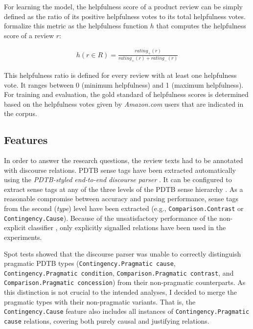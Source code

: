 \documentclass[
    a4paper,%
    12pt,%
    oneside,%
    toc=bibliography,
    final,
]{scrartcl}
\begin{document}
For learning the model, the helpfulness score of a product review can be simply defined as the ratio of its positive helpfulness votes to its total helpfulness votes. \citet[424]{Kim2006} formalize this metric as the helpfulness function $ h $ that computes the helpfulness score of a review $ r $:

\vspace{-2em}

\begin{align}
\label{helpfulness-fuction}
h(r \in R) = \frac{rating_+(r)}{rating_+(r) + rating_-(r)}
\end{align}

This helpfulness ratio is defined for every review with at least one helpfulness vote. It ranges between 0 (minimum helpfulness) and 1 (maximum helpfulness). For training and evaluation, the gold standard of helpfulness scores is determined based on the helpfulness votes given by \textit{Amazon.com} users that are indicated in the corpus.

\subsection{Features}

In order to answer the research questions, the review texts had to be annotated with discourse relations. PDTB sense tags have been extracted automatically using the \textit{PDTB-styled end-to-end discourse parser} \citep{Lin2014}. It can be configured to extract sense tags at any of the three levels of the PDTB sense hierarchy \citep[cf.][5]{Prasad2008}. As a reasonable compromise between accuracy and parsing performance, sense tags from the second (\textit{type}) level have been extracted (e.g., \lstinline|Comparison.Contrast| or \lstinline|Contingency.Cause|). Because of the unsatisfactory performance of the non-explicit classifier \citep[cf.][175]{Lin2014}, only explicitly signalled relations have been used in the experiments.


\begin{sloppypar}
Spot tests showed that the discourse parser was unable to correctly distinguish pragmatic PDTB types (\lstinline|Contingency.Pragmatic cause|, \lstinline|Contingency.Pragmatic condition|, \lstinline|Comparison.Pragmatic contrast|, and \lstinline|Comparison.Pragmatic concession|) from their non-pragmatic counterparts. As this distinction is not crucial to the intended analyses, I decided to merge the pragmatic types with their non-pragmatic variants. That is, the \lstinline|Contingency.Cause| feature also includes all instances of \lstinline|Contingency.Pragmatic cause| relations, covering both purely causal and justifying relations.
\end{sloppypar}
\end{document}

